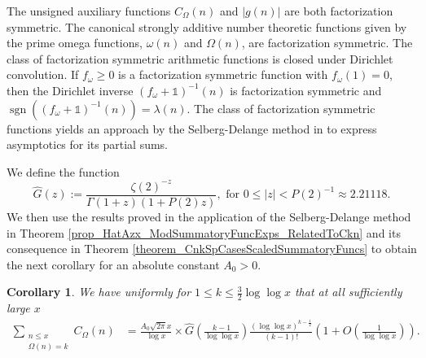 \documentclass[11pt,reqno,a4letter]{article}
\newcommand{\hlocalref}[1]{\hyperref[#1]{\ref{#1}}}
\numberwithin{equation}{section}
\numberwithin{figure}{section}
\numberwithin{table}{section}
\theoremstyle{plain}
\newtheorem{cor}[theorem]{Corollary}
\numberwithin{theorem}{section}
\theoremstyle{definition}
\begin{document}
The unsigned auxiliary functions $C_{\Omega}(n)$ and $|g(n)|$ are both factorization symmetric. 
The canonical strongly additive number theoretic functions given by the prime omega functions, 
$\omega(n)$ and $\Omega(n)$, are factorization symmetric. 
The class of factorization symmetric arithmetic functions is 
closed under Dirichlet convolution. If $f_{\omega} \geq 0$ is a 
factorization symmetric function with $f_{\omega}(1) = 0$, then 
the Dirichlet inverse $\left(f_{\omega}+\mathds{1}\right)^{-1}(n)$ 
is factorization symmetric and 
$\operatorname{sgn}\left(\left(f_{\omega}+\mathds{1}\right)^{-1}(n)\right) = \lambda(n)$. 
The class of factorization symmetric functions yields an approach by the 
Selberg-Delange method in \cite[\S II.6.1]{TENENBAUM-PROBNUMT-METHODS} 
to express asymptotics for its partial sums. 


We define the function 
\[
\widehat{G}(z) := \frac{\zeta(2)^{-z}}{\Gamma(1+z) (1+P(2)z)}, \text{ for } 
     0 \leq |z| < P(2)^{-1} \approx 2.21118.
\]
We then use the results proved in the application of the Selberg-Delange method 
in Theorem \hlocalref{prop_HatAzx_ModSummatoryFuncExps_RelatedToCkn} and 
its consequence in 
Theorem \hlocalref{theorem_CnkSpCasesScaledSummatoryFuncs} 
to obtain the next corollary for an absolute constant $A_0 > 0$. 

\begin{cor} 
\label{cor_SummatoryFuncsOfUnsignedSeqs_v2} 
We have uniformly for $1 \leq k \leq \frac{3}{2} \log\log x$ 
that at all sufficiently large $x$ 
\begin{align*} 
\sum_{\substack{n \leq x \\ \Omega(n)=k}} C_{\Omega}(n) & = 
     \frac{A_0 \sqrt{2\pi} x}{\log x} \times  
     \widehat{G}\left(\frac{k-1}{\log\log x}\right) 
     \frac{(\log\log x)^{k-\frac{1}{2}}}{(k-1)!} \left( 
     1 + O\left(\frac{1}{\log\log x}\right)\right). 
\end{align*} 
\end{cor} 
\end{document}
